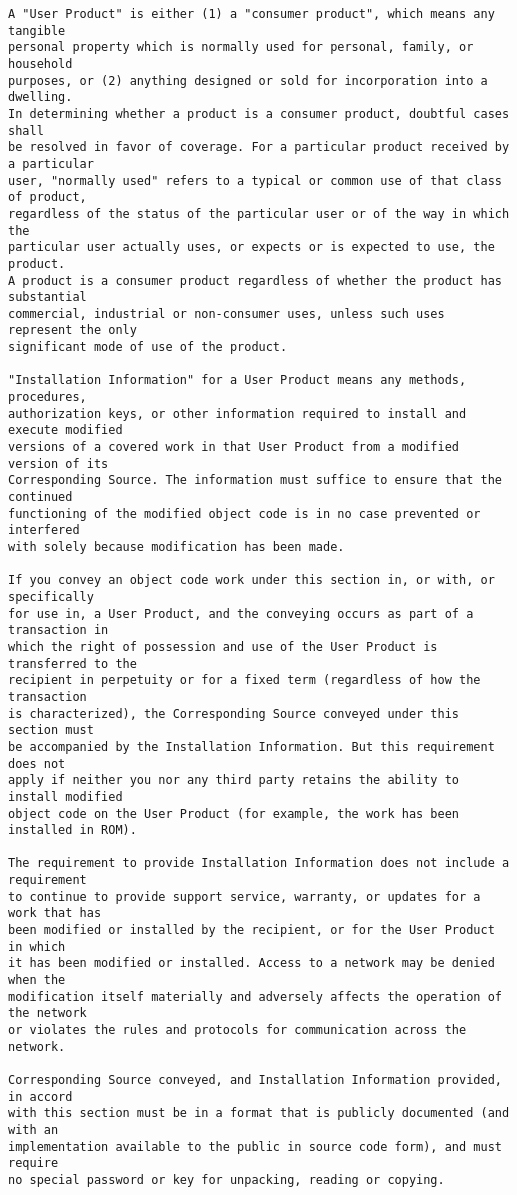 \begin{verbatim}
A "User Product" is either (1) a "consumer product", which means any tangible
personal property which is normally used for personal, family, or household
purposes, or (2) anything designed or sold for incorporation into a dwelling.
In determining whether a product is a consumer product, doubtful cases shall
be resolved in favor of coverage. For a particular product received by a particular
user, "normally used" refers to a typical or common use of that class of product,
regardless of the status of the particular user or of the way in which the
particular user actually uses, or expects or is expected to use, the product.
A product is a consumer product regardless of whether the product has substantial
commercial, industrial or non-consumer uses, unless such uses represent the only
significant mode of use of the product.

"Installation Information" for a User Product means any methods, procedures,
authorization keys, or other information required to install and execute modified
versions of a covered work in that User Product from a modified version of its
Corresponding Source. The information must suffice to ensure that the continued
functioning of the modified object code is in no case prevented or interfered
with solely because modification has been made.

If you convey an object code work under this section in, or with, or specifically
for use in, a User Product, and the conveying occurs as part of a transaction in
which the right of possession and use of the User Product is transferred to the
recipient in perpetuity or for a fixed term (regardless of how the transaction
is characterized), the Corresponding Source conveyed under this section must
be accompanied by the Installation Information. But this requirement does not
apply if neither you nor any third party retains the ability to install modified
object code on the User Product (for example, the work has been installed in ROM).

The requirement to provide Installation Information does not include a requirement
to continue to provide support service, warranty, or updates for a work that has
been modified or installed by the recipient, or for the User Product in which
it has been modified or installed. Access to a network may be denied when the
modification itself materially and adversely affects the operation of the network
or violates the rules and protocols for communication across the network.

Corresponding Source conveyed, and Installation Information provided, in accord
with this section must be in a format that is publicly documented (and with an
implementation available to the public in source code form), and must require
no special password or key for unpacking, reading or copying.


\end{verbatim}
